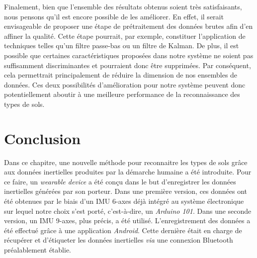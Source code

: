 Finalement, bien que l'ensemble des résultats obtenus soient très satisfaisants, nous pensons qu'il est encore possible de les améliorer. En effet, il serait envisageable de proposer une étape de prétraitement des données brutes afin d'en affiner la qualité. Cette étape pourrait, par exemple, constituer l'application de techniques telles qu'un filtre passe-bas ou un filtre de Kalman. De plus, il est possible que certaines caractéristiques proposées dans notre système ne soient pas suffisamment discriminantes et pourraient donc être supprimées. Par conséquent, cela permettrait principalement de réduire la dimension de nos ensembles de données. Ces deux possibilités d'amélioration pour notre système peuvent donc potentiellement aboutir à une meilleure performance de la reconnaissance des types de sols.

\section{Conclusion}

Dans ce chapitre, une nouvelle méthode pour reconnaitre les types de sols grâce aux données inertielles produites par la démarche humaine a été introduite. Pour ce faire, un \textit{wearable device} a été conçu dans le but d'enregistrer les données inertielles générées par son porteur. Dans une première version, ces données ont été obtenues par le biais d'un \acs{IMU} 6-axes déjà intégré au système électronique sur lequel notre choix s'est porté, c'est-à-dire, un \textit{Arduino 101}. Dans une seconde version, un \acs{IMU} 9-axes, plus précis, a été utilisé. L'enregistrement des données a été effectué grâce à une application \textit{Android}. Cette dernière était en charge de récupérer et d'étiqueter les données inertielles \textit{via} une connexion Bluetooth préalablement établie.

